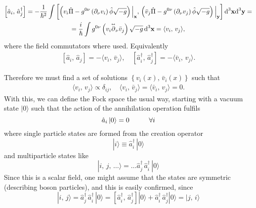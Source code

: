 \begin{multline}
	\left[\hat{a}_i,\,\hat{a}_j^\dagger\right]=-\frac{1}{\hbar^2}\int\left[\left(v_i\hat{\Pi}-g^{0\nu}\left(\partial_\nu v_i\right)\hat{\phi}\sqrt{-g}\right)\Big|_\mathbf{x},\,\left(\bar v_j\hat{\Pi}-g^{0\nu}\left(\partial_\nu v_j\right)\hat{\phi}\sqrt{-g}\right)\Big|_\mathbf{y}\right]\text{d}^3\mathbf{x}\text{d}^3\mathbf{y}=\\
	=\frac{i}{\hbar}\int g^{0\nu}\left(v_i\overset{\text{\tiny$\leftrightarrow$}}{\partial}_\nu \bar v_j\right)\sqrt{-g}\,\text{d}^3\mathbf{x}=\langle v_i,\,v_j\rangle,
\end{multline}
where the field commutators where used. Equivalently
\begin{subequations}
	\begin{gather}
		\left[\hat{a}_i,\,\hat{a}_j\right]=-\langle v_i,\,\bar v_j\rangle,\quad \left[\hat{a}_i^\dagger,\,\hat{a}_j^\dagger\right]=-\langle \bar v_i,\,v_j\rangle. \tag{\theequation \,\,a,b}
	\end{gather}
\end{subequations}

Therefore we must find a set of solutions $\left\{v_i(x),\,\bar v_i(x)\right\}$ such that
\begin{subequations}\label{eq: Operational Rules}
	\begin{gather}
		\langle v_i,\,v_j\rangle\propto \delta_{ij},\quad \langle v_i,\,\bar v_j\rangle=\langle \bar v_i,\,v_j\rangle=0. \tag{\theequation \,\,a-c}
	\end{gather}
\end{subequations}
With this, we can define the Fock space the usual way, starting with a vacuum state $|0\rangle$ such that the action of the annihilation operation fulfils
\begin{equation}
	\hat{a}_i\,|0\rangle=0\hspace{1.0cm}\forall i
\end{equation}
where single particle states are formed from the creation operator
\begin{equation}
	|i\rangle\equiv \hat{a}^\dagger_i\,|0\rangle
\end{equation}
and multiparticle states like
\begin{equation}
	|i,\,j,\,\hdots\rangle=\hdots \hat{a}_j^\dagger\,\hat{a}_i^\dagger\,|0\rangle
\end{equation}
Since this is a scalar field, one might assume that the states are symmetric (describing boson particles), and this is easily confirmed, since
\begin{equation}
	|i,\,j\rangle=\hat{a}_j^\dagger\,\hat{a}_i^\dagger\,|0\rangle=\left[\hat{a}_i^\dagger,\,\hat{a}_j^\dagger\right]|0\rangle+\hat{a}_i^\dagger\,\hat{a}_j^\dagger|0\rangle=|j,\,i\rangle
\end{equation}
